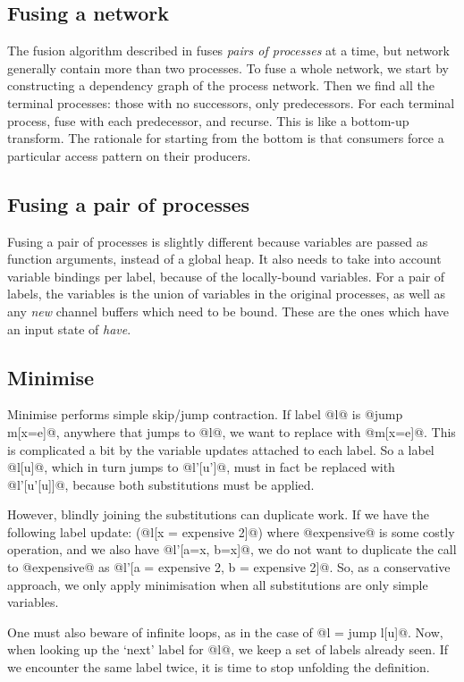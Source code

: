 \subsection{Fusing a network}
The fusion algorithm described in  fuses \emph{pairs of processes} at a time, but network generally contain more than two processes.
To fuse a whole network, we start by constructing a dependency graph of the process network.
Then we find all the terminal processes: those with no successors, only predecessors.
For each terminal process, fuse with each predecessor, and recurse.
This is like a bottom-up transform.
The rationale for starting from the bottom is that consumers force a particular access pattern on their producers.


\subsection{Fusing a pair of processes}
Fusing a pair of processes is slightly different because variables are passed as function arguments, instead of a global heap.
It also needs to take into account variable bindings per label, because of the locally-bound variables.
For a pair of labels, the variables is the union of variables in the original processes, as well as any \emph{new} channel buffers which need to be bound.
These are the ones which have an input state of \emph{have}.

\subsection{Minimise}
Minimise performs simple skip/jump contraction.
If label @l@ is @jump m[x=e]@, anywhere that jumps to @l@, we want to replace with @m[x=e]@.
This is complicated a bit by the variable updates attached to each label.
So a label @l[u]@, which in turn jumps to @l'[u']@, must in fact be replaced with @l'[u'[u]]@, because both substitutions must be applied.

However, blindly joining the substitutions can duplicate work.
If we have the following label update: (@l[x = expensive 2]@) where @expensive@ is some costly operation, and we also have @l'[a=x, b=x]@, we do not want to duplicate the call to @expensive@ as @l'[a = expensive 2, b = expensive 2]@.
So, as a conservative approach, we only apply minimisation when all substitutions are only simple variables.

One must also beware of infinite loops, as in the case of @l = jump l[u]@.
Now, when looking up the `next' label for @l@, we keep a set of labels already seen.
If we encounter the same label twice, it is time to stop unfolding the definition.

